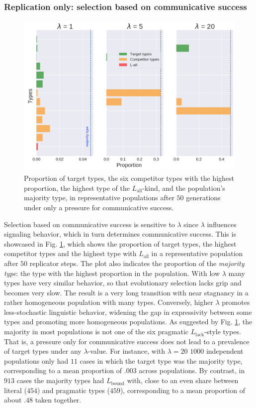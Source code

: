 \documentclass[a4paper, 11pt]{article}
\theoremstyle{Satz}
\newcommand{\mylang}[1]{\ensuremath{L_{\text{#1}}}\xspace} %
\newcommand{\Lall}{\mylang{all}}
\newcommand{\Lbound}{\mylang{bound}}
\newcommand{\Llack}{\mylang{lack}}
\begin{document}
\subsubsection{Replication only: selection based on communicative success} 

\begin{figure}[t]
\centering
\includegraphics[width=\textwidth,height=8cm, keepaspectratio]{./plots/barh-onlyr}
\caption{Proportion of target types, the six competitor types with the highest proportion, the highest type of the $\Lall$-kind, and the population's majority type, in representative populations after $50$ generations under only a
  pressure for communicative success.}
\label{fig:only-R}
\end{figure}

Selection based on communicative success is sensitive to $\lambda$ since $\lambda$
influences signaling behavior, which in turn determines communicative success. This is
showcased in Fig. \ref{fig:only-R}, which shows the proportion of target types, the highest competitor types and the highest type with $\Lall$ in a representative population after $50$ replicator steps. The plot also indicates the proportion of the
\emph{majority type}: the type with the highest proportion in the population. With
low $\lambda$ many types have very similar behavior, so that evolutionary selection lacks grip
and becomes very slow. The result is a very long transition with near stagnancy in a rather
homogeneous population with many types. Conversely, higher $\lambda$ promotes 
less-stochastic linguistic behavior, widening the gap in expressivity between some types and
promoting more homogeneous populations. As suggested by Fig. \ref{fig:only-R}, the majority
in most populations is not one of the six pragmatic $\Llack$-style types. That is, a pressure
only for communicative success does not lead to a prevalence of target types under any
$\lambda$-value. For instance, with $\lambda = 20$ $1000$ independent populations only had $11$
cases in which the target type was the majority type, corresponding to a mean proportion of
$.003$ across populations. By contrast, in $913$ cases the majority types had $\Lbound$ with,
close to an even share between literal ($454$) and pragmatic types ($459$), corresponding to a
mean proportion of about $.48$ taken together.
\end{document}
